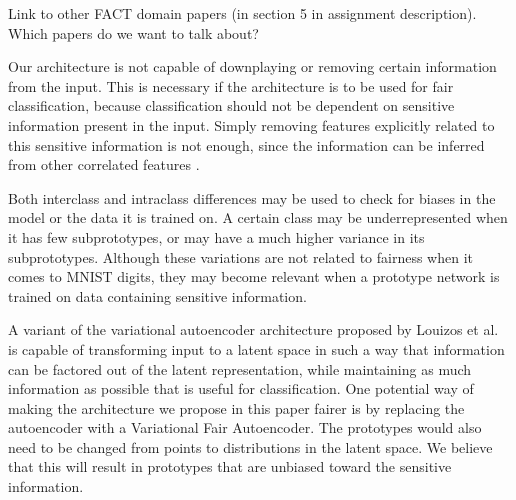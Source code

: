 Link to other FACT domain papers (in section 5 in assignment description). Which papers do we want to talk about?

Our architecture is not capable of downplaying or removing certain
information from the input. This is necessary if the architecture is to be used for fair classification, because classification should not be dependent on sensitive information present in the input. Simply removing features explicitly related to this sensitive information is not enough, since the information can be inferred from other correlated features \citep{unawarenesssucks}.

Both interclass and intraclass differences may be used to check for biases in the model or the data it is trained on. A certain class may be underrepresented when it has few subprototypes, or may have a much higher variance in its subprototypes. Although these variations are not related to fairness when it comes to MNIST digits, they may become relevant when a prototype network is trained on data containing sensitive information.

A variant of the variational autoencoder architecture \citep{vae} proposed by Louizos et al. \citep{vfae} is capable of transforming input to a latent space in such a way that information can be factored out of the latent representation, while maintaining as much information as possible that is useful for classification. One potential way of making the architecture we propose in this paper fairer is by replacing the autoencoder with a Variational Fair Autoencoder. The prototypes would also need to be changed from points to distributions in the latent space. We believe that this will result in prototypes that are unbiased toward the sensitive information.

